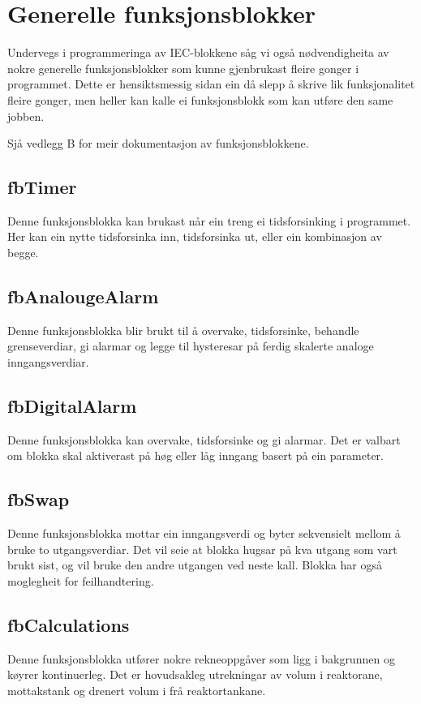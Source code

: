 \section{Generelle funksjonsblokker}
\thispagestyle{fancy}

Undervegs i programmeringa av \gls{IEC}-blokkene såg vi også nødvendigheita av nokre generelle funksjonsblokker
som kunne gjenbrukast fleire gonger i programmet. Dette er hensiktsmessig sidan ein då slepp å skrive lik 
funksjonalitet fleire gonger, men heller kan kalle ei funksjonsblokk som kan utføre den same jobben.

Sjå vedlegg B for meir dokumentasjon av funksjonsblokkene.

\subsection{fbTimer}
Denne funksjonsblokka kan brukast når ein treng ei tidsforsinking i programmet.
Her kan ein nytte tidsforsinka inn, tidsforsinka ut, eller ein kombinasjon av begge.

\subsection{fbAnalougeAlarm}
Denne funksjonsblokka blir brukt til å overvake, tidsforsinke, behandle grenseverdiar, 
gi alarmar og legge til hysteresar på ferdig skalerte analoge inngangsverdiar.

\subsection{fbDigitalAlarm}
Denne funksjonsblokka kan overvake, tidsforsinke og gi alarmar. Det er valbart om blokka skal aktiverast på høg eller låg
inngang basert på ein parameter.

\subsection{fbSwap}\label{sec:1}
Denne funksjonsblokka mottar ein inngangsverdi og byter sekvensielt mellom å bruke to utgangsverdiar. Det vil seie at blokka hugsar på kva utgang som vart brukt sist,
og vil bruke den andre utgangen ved neste kall. Blokka har også moglegheit for feilhandtering.

\subsection{fbCalculations}
Denne funksjonsblokka utfører nokre rekneoppgåver som ligg i bakgrunnen og køyrer kontinuerleg. 
Det er hovudsakleg utrekningar av volum i reaktorane, mottakstank og drenert volum i frå reaktortankane.

